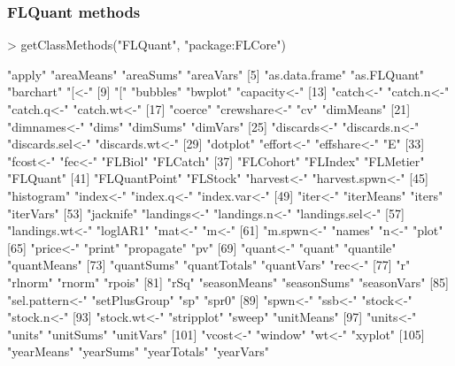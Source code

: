 \documentclass{beamer}%
\begin{document}
\begin{frame}[containsverbatim]
  \frametitle{FLQuant methods}

{\tiny{
\begin{Schunk}
\begin{Sinput}
> getClassMethods("FLQuant", "package:FLCore")
\end{Sinput}
\begin{Soutput}
  [1] "apply"          "areaMeans"      "areaSums"       "areaVars"      
  [5] "as.data.frame"  "as.FLQuant"     "barchart"       "[<-"           
  [9] "["              "bubbles"        "bwplot"         "capacity<-"    
 [13] "catch<-"        "catch.n<-"      "catch.q<-"      "catch.wt<-"    
 [17] "coerce"         "crewshare<-"    "cv"             "dimMeans"      
 [21] "dimnames<-"     "dims"           "dimSums"        "dimVars"       
 [25] "discards<-"     "discards.n<-"   "discards.sel<-" "discards.wt<-" 
 [29] "dotplot"        "effort<-"       "effshare<-"     "E"             
 [33] "fcost<-"        "fec<-"          "FLBiol"         "FLCatch"       
 [37] "FLCohort"       "FLIndex"        "FLMetier"       "FLQuant"       
 [41] "FLQuantPoint"   "FLStock"        "harvest<-"      "harvest.spwn<-"
 [45] "histogram"      "index<-"        "index.q<-"      "index.var<-"   
 [49] "iter<-"         "iterMeans"      "iters"          "iterVars"      
 [53] "jacknife"       "landings<-"     "landings.n<-"   "landings.sel<-"
 [57] "landings.wt<-"  "loglAR1"        "mat<-"          "m<-"           
 [61] "m.spwn<-"       "names"          "n<-"            "plot"          
 [65] "price<-"        "print"          "propagate"      "pv"            
 [69] "quant<-"        "quant"          "quantile"       "quantMeans"    
 [73] "quantSums"      "quantTotals"    "quantVars"      "rec<-"         
 [77] "r"              "rlnorm"         "rnorm"          "rpois"         
 [81] "rSq"            "seasonMeans"    "seasonSums"     "seasonVars"    
 [85] "sel.pattern<-"  "setPlusGroup"   "sp"             "spr0"          
 [89] "spwn<-"         "ssb<-"          "stock<-"        "stock.n<-"     
 [93] "stock.wt<-"     "stripplot"      "sweep"          "unitMeans"     
 [97] "units<-"        "units"          "unitSums"       "unitVars"      
[101] "vcost<-"        "window"         "wt<-"           "xyplot"        
[105] "yearMeans"      "yearSums"       "yearTotals"     "yearVars"      
\end{Soutput}
\end{Schunk}
}}

\end{frame}
\end{document}
